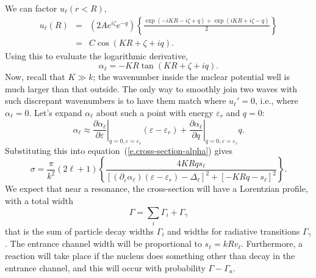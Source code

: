 We can factor $u_{\ell}(r<R)$,
\begin{eqnarray*}
u_{\ell}(R) &=& \left(2A e^{i\zeta}e^{-q}\right)\left\{\frac{\exp(-iKR -i \zeta + q) + \exp(iKR + i \zeta - q)}{2}\right\} \\
 &=& C\cos(KR+\zeta + iq).
\end{eqnarray*}
Using this to evaluate the logarithmic derivative,
\begin{equation}\label{e.alpha}
\alpha_{\ell} = -KR\tan(KR + \zeta + iq).
\end{equation}
Now, recall that $K \gg k$; the wavenumber inside the nuclear potential well is much larger than that outside.  The only way to smoothly join two waves with such discrepant wavenumbers is to have them match where $u_{\ell}' = 0$, i.e., where $\alpha_{\ell} = 0$.  Let's expand $\alpha_{\ell}$ about such a point with energy $\varepsilon_{r}$ and $q = 0$:
\[
\alpha_{\ell} \approx \left.\frac{\partial\alpha_{\ell}}{\partial \varepsilon}\right|_{q=0,\varepsilon=\varepsilon_{r}}(\varepsilon - \varepsilon_{r}) + \left.\frac{\partial\alpha_{\ell}}{\partial q}\right|_{q=0,\varepsilon=\varepsilon_{r}} q.
\]
Substituting this into equation~(\ref{e.cross-section-alpha}) gives
\begin{equation}\label{e.sigma-penultimate}
\sigma = \frac{\pi}{k^{2}}(2\ell+1)\left\{\frac{ 4KRq s_{\ell}}{[(\partial_{\varepsilon}\alpha_{\ell})(\varepsilon - \varepsilon_{r}) - \Delta_{\ell}]^{2} + [ -KRq - s_{\ell}]^{2}}\right\}.
\end{equation}
We expect that near a resonance, the cross-section will have a Lorentzian profile, with a total width
\[
\Gamma = \sum_{i}\Gamma_{i} + \Gamma_{\gamma}
\]
that is the sum of particle decay widths $\Gamma_{i}$ and widths for radiative transitions $\Gamma_{\gamma}$.  The entrance channel width will be proportional to $s_{\ell}=kRv_{\ell}$. Furthermore, a reaction will take place if the nucleus does something other than decay in the entrance channel, and this will occur with probability $\Gamma - \Gamma_{a}$.  

